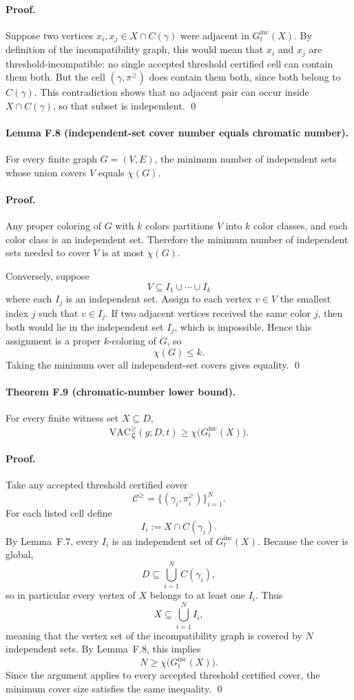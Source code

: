 \paragraph{Proof.}
Suppose two vertices $x_i,x_j\in X\cap C(\gamma)$ were adjacent in $G_t^{\mathrm{inc}}(X)$. By definition of the incompatibility graph, this would mean that $x_i$ and $x_j$ are threshold-incompatible: no single accepted threshold certified cell can contain them both. But the cell $(\gamma,\pi^{\ge})$ does contain them both, since both belong to $C(\gamma)$. This contradiction shows that no adjacent pair can occur inside $X\cap C(\gamma)$, so that subset is independent. \qed

\paragraph{Lemma F.8 (independent-set cover number equals chromatic number).}
For every finite graph $G=(V,E)$, the minimum number of independent sets whose union covers $V$ equals $\chi(G)$.

\paragraph{Proof.}
Any proper coloring of $G$ with $k$ colors partitions $V$ into $k$ color classes, and each color class is an independent set. Therefore the minimum number of independent sets needed to cover $V$ is at most $\chi(G)$.

Conversely, suppose
\[
V\subseteq I_1\cup\cdots\cup I_k
\]
where each $I_j$ is an independent set. Assign to each vertex $v\in V$ the smallest index $j$ such that $v\in I_j$. If two adjacent vertices received the same color $j$, then both would lie in the independent set $I_j$, which is impossible. Hence this assignment is a proper $k$-coloring of $G$, so
\[
\chi(G)\le k.
\]
Taking the minimum over all independent-set covers gives equality. \qed

\paragraph{Theorem F.9 (chromatic-number lower bound).}
For every finite witness set $X\subseteq D$,
\[
\mathrm{VAC}^{\ge}_{\mathfrak L}(g;D,t)
\ge
\chi\bigl(G_t^{\mathrm{inc}}(X)\bigr).
\]

\paragraph{Proof.}
Take any accepted threshold certified cover
\[
\mathcal C^{\ge}
=
\{(\gamma_i,\pi_i^{\ge})\}_{i=1}^N.
\]
For each listed cell define
\[
I_i:=X\cap C(\gamma_i).
\]
By Lemma~F.7, every $I_i$ is an independent set of $G_t^{\mathrm{inc}}(X)$. Because the cover is global,
\[
D\subseteq \bigcup_{i=1}^N C(\gamma_i),
\]
so in particular every vertex of $X$ belongs to at least one $I_i$. Thus
\[
X\subseteq \bigcup_{i=1}^N I_i,
\]
meaning that the vertex set of the incompatibility graph is covered by $N$ independent sets. By Lemma~F.8, this implies
\[
N\ge \chi\bigl(G_t^{\mathrm{inc}}(X)\bigr).
\]
Since the argument applies to every accepted threshold certified cover, the minimum cover size satisfies the same inequality. \qed

